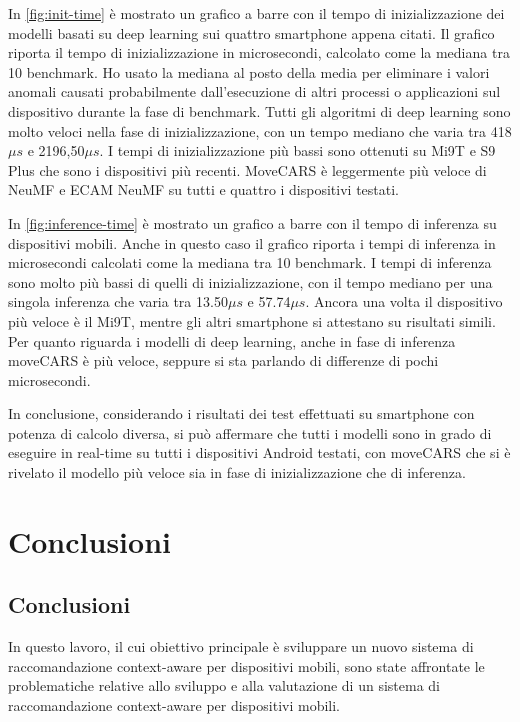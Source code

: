 \documentclass[12pt,italian]{report}
\begin{document}
\noindent In \autoref{fig:init-time} è mostrato un grafico a barre con il tempo di inizializzazione dei modelli basati su deep learning sui quattro smartphone appena citati. Il grafico riporta il tempo di inizializzazione in microsecondi, calcolato come la mediana tra 10 benchmark. Ho usato la mediana al posto della media per eliminare i valori anomali causati probabilmente dall'esecuzione di altri processi o applicazioni sul dispositivo durante la fase di benchmark. Tutti gli algoritmi di deep learning sono molto veloci nella fase di inizializzazione, con un tempo mediano che varia tra 418$\mu s$ e 2196,50$\mu s$. I tempi di inizializzazione più bassi sono ottenuti su Mi9T e S9 Plus che sono i dispositivi più recenti. MoveCARS è leggermente più veloce di NeuMF e ECAM NeuMF su tutti e quattro i dispositivi testati.

In \autoref{fig:inference-time} è mostrato un grafico a barre con il tempo di inferenza su dispositivi mobili. Anche in questo caso il grafico riporta i tempi di inferenza in microsecondi calcolati come la mediana tra 10 benchmark. I tempi di inferenza sono molto più bassi di quelli di inizializzazione, con il tempo mediano per una singola inferenza che varia tra 13.50$\mu s$ e 57.74$\mu s$. Ancora una volta il dispositivo più veloce è il Mi9T, mentre gli altri smartphone si attestano su risultati simili. Per quanto riguarda i modelli di deep learning, anche in fase di inferenza moveCARS è più veloce, seppure si sta parlando di differenze di pochi microsecondi. 

In conclusione, considerando i risultati dei test effettuati su smartphone con potenza di calcolo diversa, si può affermare che tutti i modelli sono in grado di eseguire in real-time su tutti i dispositivi Android testati, con moveCARS che si è rivelato il modello più veloce sia in fase di inizializzazione che di inferenza.


% 
% 

\chapter{Conclusioni} \label{chap:conclusioni}

\section{Conclusioni}
In questo lavoro, il cui obiettivo principale è sviluppare un nuovo sistema di raccomandazione context-aware per dispositivi mobili, sono state affrontate le problematiche relative allo sviluppo e alla valutazione di un sistema di raccomandazione context-aware per dispositivi mobili.
\end{document}
